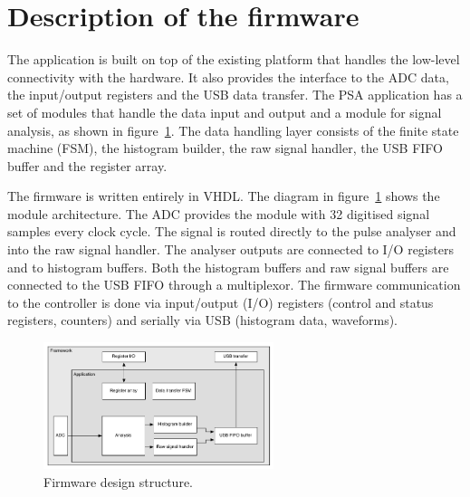 %
% 



\section{Description of the firmware}
The application is built on top of the existing platform that handles the low-level connectivity with the hardware. It also provides the interface to the ADC data, the input/output registers and the USB data transfer. The PSA application has a set of modules that handle the data input and output and a module for signal analysis, as shown in figure~\ref{fig:application}. 
The data handling layer consists of the finite state machine (FSM), the histogram builder, the raw signal handler, the USB FIFO buffer and the register array.

The firmware is written entirely in VHDL. The diagram in figure~\ref{fig:application} shows the module architecture. The ADC provides the module with 32 digitised signal samples every clock cycle. The signal is routed directly to the pulse analyser and into the raw signal handler. The analyser outputs are connected to I/O registers and to histogram buffers. Both the histogram buffers and raw signal buffers are connected to the USB FIFO through a multiplexor. The firmware communication to the controller is done via input/output (I/O) registers (control and status registers, counters) and serially via USB (histogram data, waveforms). 


\begin{figure}[!t]
\centering
\includegraphics[width=0.6\textwidth]{05_current_monitoring/plots/application}
\caption{Firmware design structure.}
\label{fig:application}
\end{figure}


